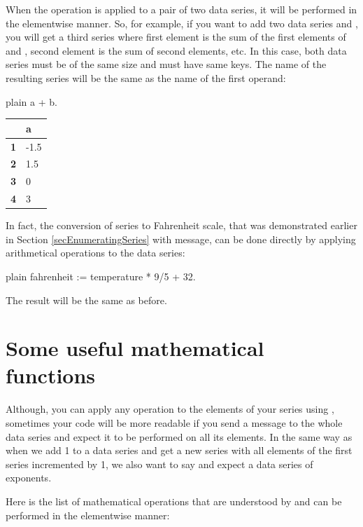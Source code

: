 \documentclass[10pt,twoside,english]{_support/latex/sbabook/sbabook}
\begin{document}
When the operation is applied to a pair of two data series, it will be performed in the elementwise manner. So, for example, if you want to add two data series  and , you will get a third series where first element is the sum of the first elements of  and , second element is the sum of second elements, etc. In this case, both data series must be of the same size and must have same keys. The name of the resulting series will be the same as the name of the first operand:

\begin{displaycode}{plain}
a + b.
\end{displaycode}

\begin{tabular}{ll}
\toprule
 & \textbf{a} \\
\midrule
\textbf{1} & -1.5 \\
\textbf{2} & 1.5 \\
\textbf{3} & 0 \\
\textbf{4} & 3 \\
\bottomrule
\end{tabular}

In fact, the conversion of  series to Fahrenheit scale, that was demonstrated earlier in Section \ref{secEnumeratingSeries} with  message, can be done directly by applying arithmetical operations to the data series:

\begin{displaycode}{plain}
fahrenheit := temperature * 9/5 + 32.
\end{displaycode}

The result will be the same as before.
\section{Some useful mathematical functions}
Although, you can apply any operation to the elements of your series using , sometimes your code will be more readable if you send a message to the whole data series and expect it to be performed on all its elements. In the same way as when we add 1 to a data series and get a new series with all elements of the first series incremented by 1, we also want to say  and expect a data series of exponents.

Here is the list of mathematical operations that are understood by  and can be performed in the elementwise manner:
\end{document}
